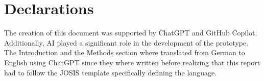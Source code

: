 \documentclass{josis}
\begin{document}
\section*{Declarations}

The creation of this document was supported by ChatGPT and GitHub Copilot. 
Additionally, AI played a significant role in the development of the prototype.
The Introduction and the Methods section where translated from German to English using
ChatGPT since they where written before realizing that this report had to follow the JOSIS template
specifically defining the language.



\end{document}
